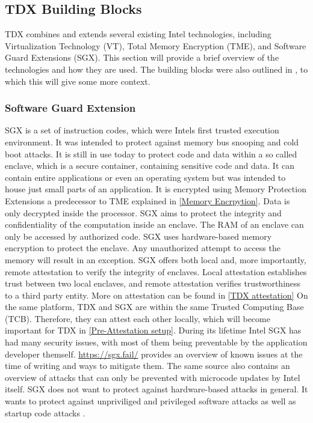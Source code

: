 \subsection{TDX Building Blocks}
\label{sec:tdxBuildingBlocks}
TDX combines and extends several existing Intel technologies, including Virtualization Technology (VT), Total Memory Encryption (TME), and Software Guard Extensions (SGX). This section will provide a brief overview of the technologies and how they are used. The building blocks were also outlined in \cite{cheng_intel_2023}, to which this will give some more context.
\subsubsection{Software Guard Extension}
SGX is a set of instruction codes, which were Intels first trusted execution environment. It was intended to protect against memory bus snooping and cold boot attacks. It is still in use today to protect code and data within a so called enclave, which is a secure container, containing sensitive code and data. It can contain entire applications or even an operating system but was intended to house just small parts of an application. It is encrypted using Memory Protection Extensions a predecessor to TME explained in \cref{Memory Encrpytion}. Data is only decrypted inside the processor\cite{intel_corporation_overview--intel-sgx-enclave_nodate}. SGX aims to protect the integrity and confidentiality of the computation inside an enclave. The RAM of an enclave can only be accessed by authorized code. SGX uses hardware-based memory encryption to protect the enclave. Any unauthorized attempt to access the memory will result in an exception. SGX offers both local and, more importantly, remote attestation to verify the integrity of enclaves. Local attestation establishes trust between two local enclaves, and remote attestation verifies trustworthiness to a third party entity. More on attestation can be found in \cref{TDX attestation} On the same platform, TDX and SGX are within the same Trusted Computing Base (TCB).  Therefore, they can attest each other locally\cite{intel_corporation_intel_2024-1}, which will become important for TDX in \cref{Pre-Attestation setup}. During its lifetime Intel SGX has had many security issues, with most of them being preventable by the application developer themself. \url{https://sgx.fail/}\cite{sgxfail} provides an overview of known issues at the time of writing and ways to mitigate them. The same source also contains an overview of attacks that can only be prevented with microcode updates by Intel itself. SGX does not want to protect against hardware-based attacks in general\cite{costan_intel_2016}. It wants to protect against unpriviliged and privileged software attacks as well as startup code attacks \cite{schutz_general_nodate}.
